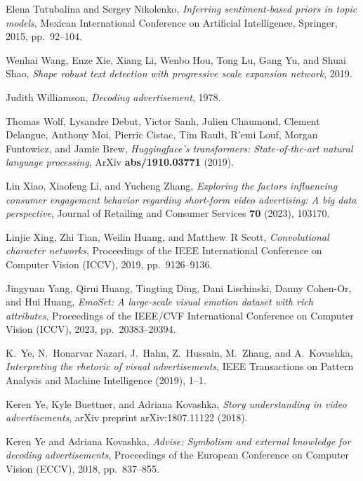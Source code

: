 \documentclass{zapiski}
\begin{document}
\begin{thebibliography}{10}
Elena Tutubalina and Sergey Nikolenko, \emph{Inferring sentiment-based priors
  in topic models}, Mexican International Conference on Artificial
  Intelligence, Springer, 2015, pp.~92--104.

Wenhai Wang, Enze Xie, Xiang Li, Wenbo Hou, Tong Lu, Gang Yu, and Shuai Shao,
  \emph{Shape robust text detection with progressive scale expansion network},
  2019.

Judith Williamson, \emph{Decoding advertisement}, 1978.

Thomas Wolf, Lysandre Debut, Victor Sanh, Julien Chaumond, Clement Delangue,
  Anthony Moi, Pierric Cistac, Tim Rault, R'emi Louf, Morgan Funtowicz, and
  Jamie Brew, \emph{Huggingface's transformers: State-of-the-art natural
  language processing}, ArXiv \textbf{abs/1910.03771} (2019).

Lin Xiao, Xiaofeng Li, and Yucheng Zhang, \emph{Exploring the factors
  influencing consumer engagement behavior regarding short-form video
  advertising: A big data perspective}, Journal of Retailing and Consumer
  Services \textbf{70} (2023), 103170.

Linjie Xing, Zhi Tian, Weilin Huang, and Matthew~R Scott, \emph{Convolutional
  character networks}, Proceedings of the IEEE International Conference on
  Computer Vision (ICCV), 2019, pp.~9126--9136.

Jingyuan Yang, Qirui Huang, Tingting Ding, Dani Lischinski, Danny Cohen-Or, and
  Hui Huang, \emph{{EmoSet}: A large-scale visual emotion dataset with rich
  attributes}, Proceedings of the IEEE/CVF International Conference on Computer
  Vision (ICCV), 2023, pp.~20383--20394.

K.~{Ye}, N.~{Honarvar Nazari}, J.~{Hahn}, Z.~{Hussain}, M.~{Zhang}, and
  A.~{Kovashka}, \emph{Interpreting the rhetoric of visual advertisements},
  IEEE Transactions on Pattern Analysis and Machine Intelligence (2019), 1--1.

Keren Ye, Kyle Buettner, and Adriana Kovashka, \emph{Story understanding in
  video advertisements}, arXiv preprint arXiv:1807.11122 (2018).

Keren Ye and Adriana Kovashka, \emph{Advise: Symbolism and external knowledge
  for decoding advertisements}, Proceedings of the European Conference on
  Computer Vision (ECCV), 2018, pp.~837--855.


\end{thebibliography}
\end{document}
